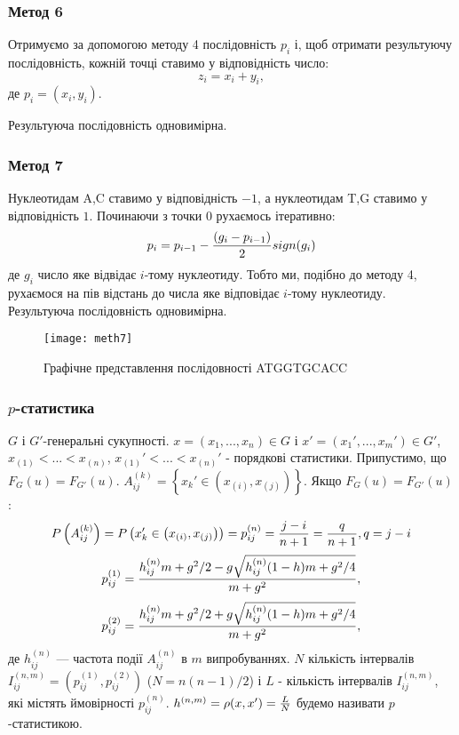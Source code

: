 \documentclass[mathserif,serif,10pt]{beamer}
\begin{document}
\begin{frame}
\frametitle{Метод 6}

Отримуємо за допомогою методу 4 послідовність $p_i$ і, щоб отримати результуючу послідовність, кожній точці ставимо у відповідність число:
\[z_i = x_i + y_i,\]
де $p_i = (x_i,y_i)$.
\par
Результуюча послідовність одновимірна.

\end{frame}

\begin{frame}
\frametitle{Метод 7}
Нуклеотидам A,C ставимо у відповідність $-1$, а нуклеотидам T,G ставимо у відповідність $1$. Починаючи з точки $0$ рухаємось ітеративно:
\[p_i = p_{i-1} - {(g_i-p_{i-1}) \over{2}}sign(g_i)\]
де $g_i$ число яке відвідає $i$-тому нуклеотиду. Тобто ми, подібно до методу 4, рухаємося на пів відстань до числа яке відповідає $i$-тому нуклеотиду.
Результуюча послідовність одновимірна.

\begin{figure}[h!]
\centering
\texttt{[image: meth7]}
\caption{Графічне представлення послідовності ATGGTGCACC}
\end{figure}

\end{frame}

\begin{frame}
\frametitle{$p$-статистика}
$G$ і $G'$-генеральні сукупності.
$x=(x_1,...,x_n)\in G$ і $x'=(x_1',...,x_m')\in G'$, $x_{(1)}<...<x_{(n)}$, $x_{(1)}'<...<x_{(n)}'$ - порядкові статистики.
Припустимо, що $F_G(u) = F_{G'}(u)$.
$A_{ij}^{(k)} = \left\{x_k' \in \left(x_{(i)}, x_{(j)}\right)\right\}$.
Якщо $F_G(u) = F_{G'}(u)$:
\[P\left(A_{ij}^{(k)}\right) = P\left(x_k' \in \left(x_{(i)}, x_{(j)}\right)\right) = p_{ij}^{(n)} = {{j-i}\over{n+1}} = {{q}\over{n+1}}, q = j-i\]
\begin{equation}\label{eq:p1}
p_{ij}^{(1)} = {{h_{ij}^{(n)}m+g^2/2-g\sqrt{h_{ij}^{(n)}(1-h)m+g^2/4}}\over{m+g^2}},
\end{equation}
\begin{equation}\label{eq:p2}
p_{ij}^{(2)} = {{h_{ij}^{(n)}m+g^2/2+g\sqrt{h_{ij}^{(n)}(1-h)m+g^2/4}}\over{m+g^2}},
\end{equation}
де $h_{ij}^{(n)}$ — частота події $A_{ij}^{(n)}$
в $m$ випробуваннях.
$N$ кількість інтервалів
$I_{ij}^{(n,m)} = \left(p_{ij}^{(1)},p_{ij}^{(2)}\right)$ ($N=n(n-1)/2$) і $L$ -
кількість інтервалів $I_{ij}^{(n,m)}$, які містять ймовірності $p_{ij}^{(n)}$.
$h^{(n,m)}= \rho(x,x') = {L\over{N}}$ будемо називати $p$-статистикою.
\end{frame}
\end{document}
